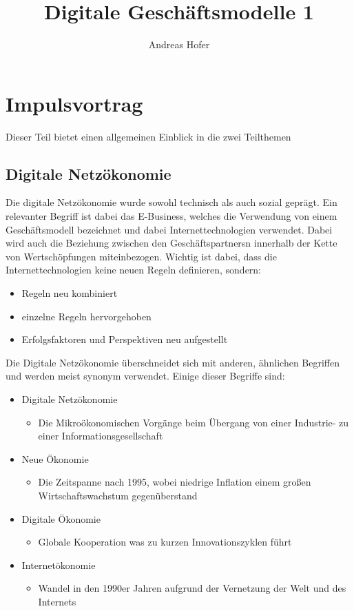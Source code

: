 \documentclass{article}
\title{\vspace{-1cm}Digitale Geschäftsmodelle 1}
\author{Andreas Hofer}
\begin{document}
	\maketitle
	\tableofcontents
	\section{Impulsvortrag}
	Dieser Teil bietet einen allgemeinen Einblick in die zwei Teilthemen
	\subsection{Digitale Netzökonomie}
	Die digitale Netzökonomie wurde sowohl technisch als auch sozial geprägt. Ein relevanter Begriff ist dabei das E-Business, welches die Verwendung von einem Geschäftsmodell bezeichnet und dabei Internettechnologien verwendet. Dabei wird auch die Beziehung zwischen den Geschäftspartnersn innerhalb der Kette von Wertschöpfungen miteinbezogen. Wichtig ist dabei, dass die Internettechnologien keine neuen Regeln definieren, sondern:
	\begin{itemize}
		\item{Regeln neu kombiniert}
		\item{einzelne Regeln hervorgehoben}
		\item{Erfolgsfaktoren und Perspektiven neu aufgestellt}
	\end{itemize}
	Die Digitale Netzökonomie überschneidet sich mit anderen, ähnlichen Begriffen und werden meist synonym verwendet. Einige dieser Begriffe sind:
	\begin{itemize}
		\item{Digitale Netzökonomie}
		\begin{itemize}
			\item{Die Mikroökonomischen Vorgänge beim Übergang von einer Industrie- zu einer Informationsgesellschaft}
		\end{itemize}
		\item{Neue Ökonomie}
		\begin{itemize}
			\item{Die Zeitspanne nach 1995, wobei niedrige Inflation einem großen Wirtschaftswachstum gegenüberstand}
		\end{itemize}
		\item{Digitale Ökonomie}
		\begin{itemize}
			\item{Globale Kooperation was zu kurzen Innovationszyklen führt}
		\end{itemize}
		\item{Internetökonomie}
		\begin{itemize}
			\item{Wandel in den 1990er Jahren aufgrund der Vernetzung der Welt und des Internets}
		\end{itemize}
	\end{itemize}
\end{document}
